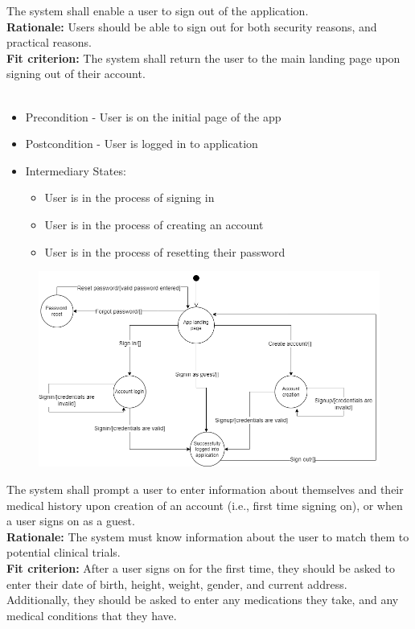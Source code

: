\documentclass[12pt, titlepage]{article}
\newcounter{FR_Counter}
\begin{document}
The system shall enable a user to sign out of the application.\\
\textbf{Rationale:}
Users should be able to sign out for both security reasons, and practical reasons.\\
\textbf{Fit criterion:}
The system shall return the user to the main landing page upon signing out of their account.\\~\\
\addtocounter{FR_Counter}{1}


\begin{itemize}
    \item Precondition - User is on the initial page of the app
    \item Postcondition - User is logged in to application
    \item Intermediary States:
    \begin{itemize}
        \item User is in the process of signing in
        \item User is in the process of creating an account
        \item User is in the process of resetting their password
    \end{itemize} 
\end{itemize}

\begin{figure}[H]
\includegraphics[width=\textwidth]{Signup_state_machine}
\end{figure}


The system shall prompt a user to enter information about themselves and their medical history 
upon creation of an account (i.e., first time signing on), or when a user signs on as a guest.\\
\textbf{Rationale:}
The system must know information about the user to match them to potential clinical trials.\\
\textbf{Fit criterion:}
After a user signs on for the first time, they should be asked to enter their date of birth, height, weight, gender, and 
current address. Additionally, they should be asked to enter any medications they take, and any medical conditions that they have.\\~\\
\addtocounter{FR_Counter}{1}
\end{document}
